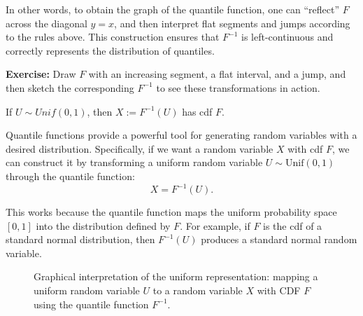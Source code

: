 \medskip

In other words, to obtain the graph of the quantile function, one can “reflect” \(F\) across the diagonal \(y=x\), and then interpret flat segments and jumps according to the rules above. This construction ensures that \(F^{-1}\) is left-continuous and correctly represents the distribution of quantiles.  

\medskip

\textbf{Exercise:} Draw \(F\) with an increasing segment, a flat interval, and a jump, and then sketch the corresponding \(F^{-1}\) to see these transformations in action.

%
\label{par:Uniform Representation}
\begin{lemma}
    \label{lemma:uni_repre}
    If \(U \sim Unif(0,1)\), then \(X := F^{-1}(U)\) has cdf \(F\).
\end{lemma}

Quantile functions provide a powerful tool for generating random variables with a desired distribution. Specifically, if we want a random variable \(X\) with cdf \(F\), we can construct it by transforming a uniform random variable \(U \sim \mathrm{Unif}(0,1)\) through the quantile function:
\[
    X = F^{-1}(U).
\]

This works because the quantile function maps the uniform probability space \([0,1]\) into the distribution defined by \(F\). For example, if \(F\) is the cdf of a standard normal distribution, then \(F^{-1}(U)\) produces a standard normal random variable. 

\begin{figure}[h!]
\centering
{}
\caption{Graphical interpretation of the uniform representation: mapping a uniform random variable $U$ to a random variable $X$ with CDF $F$ using the quantile function $F^{-1}$.}
\end{figure}

